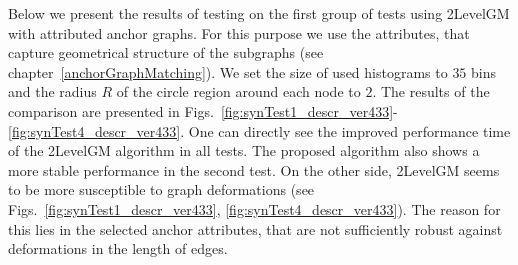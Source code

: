 Below we present the results of testing on the first group of tests using 2LevelGM with attributed anchor graphs. For this purpose we use the attributes, that capture geometrical structure of the subgraphs (see chapter~\ref{anchorGraphMatching}). We set the size of used histograms to $35$ bins and the radius $R$ of the circle region around each node to $2$. The results of the comparison are presented in Figs.~\ref{fig:synTest1_descr_ver433}-\ref{fig:synTest4_descr_ver433}. One can directly see the improved performance time of the 2LevelGM algorithm in all tests. The proposed algorithm also shows a more stable performance in the second test. 
On the other side, 2LevelGM seems to be more susceptible to graph deformations (see Figs.~\ref{fig:synTest1_descr_ver433}, \ref{fig:synTest4_descr_ver433}). The reason for this lies in the selected anchor attributes, that are not sufficiently robust against deformations in the length of edges.

